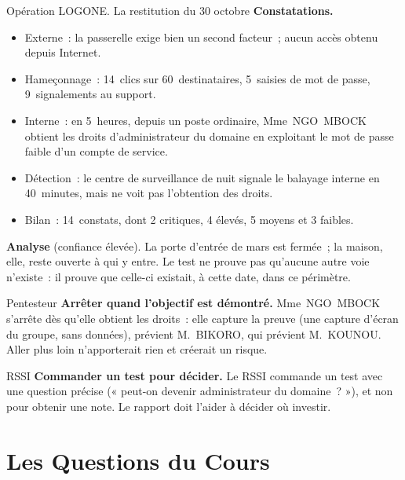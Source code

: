 \begin{boxscenario}{Opération LOGONE. La restitution du 30 octobre}
\textbf{Constatations.}
\begin{itemize}
    \item Externe~: la passerelle exige bien un second facteur~; aucun accès
          obtenu depuis Internet.
    \item Hameçonnage~: 14~clics sur 60~destinataires, 5~saisies de mot de
          passe, 9~signalements au support.
    \item Interne~: en 5~heures, depuis un poste ordinaire, Mme~NGO~MBOCK
          obtient les droits d'administrateur du domaine en exploitant le
          mot de passe faible d'un compte de service.
    \item Détection~: le centre de surveillance de nuit signale le balayage
          interne en 40~minutes, mais ne voit pas l'obtention des droits.
    \item Bilan~: 14~constats, dont 2 critiques, 4 élevés, 5 moyens et
          3 faibles.
\end{itemize}

\medskip
\textbf{Analyse} (confiance élevée). La porte d'entrée de mars est fermée~;
la maison, elle, reste ouverte à qui y entre. Le test ne prouve pas
qu'aucune autre voie n'existe~: il prouve que celle-ci existait, à cette
date, dans ce périmètre.
\end{boxscenario}

\begin{boxmetier}{Pentesteur}
\textbf{Arrêter quand l'objectif est démontré.} Mme~NGO~MBOCK s'arrête
dès qu'elle obtient les droits~: elle capture la preuve (une capture
d'écran du groupe, sans données), prévient M.~BIKORO, qui prévient
M.~KOUNOU. Aller plus loin n'apporterait rien et créerait un risque.
\end{boxmetier}

\begin{boxmetier}{RSSI}
\textbf{Commander un test pour décider.} Le RSSI commande un test avec une
question précise (« peut-on devenir administrateur du domaine~? »), et non
pour obtenir une note. Le rapport doit l'aider à décider où investir.
\end{boxmetier}

\section{Les Questions du Cours}
\label{sec:p00-questions}


